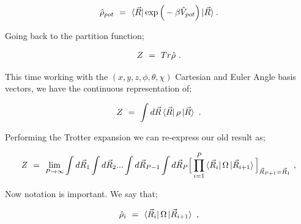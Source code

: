 \documentclass{article}
\begin{document}
\begin{equation} \label{eq:1}
\hat{\rho}_{pot} \hspace{0.125cm} = \hspace{0.125cm} \bra{\vec{R}} \exp \Big( - \beta \hat{V}_{pot} \Big) \ket{\vec{R}} \hspace{0.025cm} .
\end{equation}

Going back to the partition function;

\begin{equation} \label{eq:1}
Z \hspace{0.125cm} = \hspace{0.125cm} Tr\hat{\rho} \hspace{0.125cm} .
\end{equation}

This time working with the \begin{math} (x, y, z, \phi, \theta, \chi) \end{math} Cartesian and Euler Angle basis vectors, we have the continuous representation of;

\begin{equation} \label{eq:1}
Z \hspace{0.125cm} = \hspace{0.125cm} \int d \vec{R} \bra{\vec{R}} \rho \ket{\vec{R}} \hspace{0.125cm} .
\end{equation}

Performing the Trotter expansion we can re-express our old result as;

\begin{equation} \label{eq:1}
Z \hspace{0.125cm} = \hspace{0.125cm}  \lim_{P \rightarrow \infty} \int d \vec{R}_1 \int d \vec{R}_2 ... \int d \vec{R}_{P - 1} \int d \vec{R}_P \Big[ \prod_{i=1}^{P} \bra{\vec{R}_i} \Omega \ket{\vec{R}_{i+1}} \Big]_{\vec{R}_{P+1} = \vec{R}_1} \hspace{0.125cm} , 
\end{equation}

Now notation is important. We say that;

\begin{equation} \label{eq:1}
\hat{\rho}_i \hspace{0.125cm} = \hspace{0.125cm} \bra{\vec{R}_i} \Omega \ket{\vec{R}_{i+1}} \hspace{0.125cm} , 
\end{equation}
\end{document}
